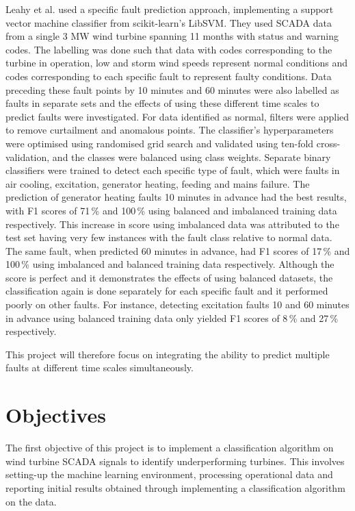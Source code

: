 Leahy et al. \cite{Leahy16} used a specific fault prediction approach, implementing a support vector machine classifier from scikit-learn's LibSVM. They used SCADA data from a single 3 MW wind turbine spanning 11 months with status and warning codes. The labelling was done such that data with codes corresponding to the turbine in operation, low and storm wind speeds represent normal conditions and codes corresponding to each specific fault to represent faulty conditions. Data preceding these fault points by 10 minutes and 60 minutes were also labelled as faults in separate sets and the effects of using these different time scales to predict faults were investigated. For data identified as normal, filters were applied to remove curtailment and anomalous points. The classifier's hyperparameters were optimised using randomised grid search and validated using ten-fold cross-validation, and the classes were balanced using class weights. Separate binary classifiers were trained to detect each specific type of fault, which were faults in air cooling, excitation, generator heating, feeding and mains failure. The prediction of generator heating faults 10 minutes in advance had the best results, with F1 scores of 71\,\% and 100\,\% using balanced and imbalanced training data respectively. This increase in score using imbalanced data was attributed to the test set having very few instances with the fault class relative to normal data. The same fault, when predicted 60 minutes in advance, had F1 scores of 17\,\% and 100\,\% using imbalanced and balanced training data respectively. Although the score is perfect and it demonstrates the effects of using balanced datasets, the classification again is done separately for each specific fault and it performed poorly on other faults. For instance, detecting excitation faults 10 and 60 minutes in advance using balanced training data only yielded F1 scores of 8\,\% and 27\,\% respectively.

This project will therefore focus on integrating the ability to predict multiple faults at different time scales simultaneously.

\section{Objectives}

The first objective of this project is to implement a classification algorithm on wind turbine SCADA signals to identify underperforming turbines. This involves setting-up the machine learning environment, processing operational data and reporting initial results obtained through implementing a classification algorithm on the data.

